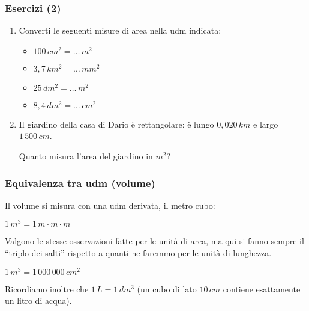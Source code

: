 \documentclass[]{beamer}
\begin{document}
\begin{frame}
\frametitle{Esercizi (2)}
\begin{enumerate}
  \item Converti le seguenti misure di area nella udm indicata:
  \begin{multicols}{2}
    \begin{itemize}
        \item $ 100 \, cm^2 = \ldots \, m^2 $
        \item $ 3,7 \, km^2 = \ldots \, mm^2 $
        \item $ 25 \, dm^2 = \ldots \, m^2 $
        \item $ 8,4 \, dm^2 = \ldots \, cm^2 $
    \end{itemize}
  \end{multicols}
  \item Il giardino della casa di Dario è rettangolare: è lungo $ 0,020 \, km $ e largo $ 1\,500 \, cm $.
  
  Quanto misura l'area del giardino in $ m^2 $?
\end{enumerate}
\end{frame}




\begin{frame}
\frametitle{Equivalenza tra udm (volume)}
Il volume si misura con una udm derivata, il \alert<1>{metro cubo}:
\begin{center}
$ 1 \, m^3 = 1 \, m \cdot m \cdot m $
\end{center}\pause
Valgono le stesse osservazioni fatte per le unità di area, ma qui \alert<2>{si fanno sempre il ``triplo dei salti''} rispetto a quanti ne faremmo per le unità di lunghezza.
\begin{center}
$ 1 \, m^3 = 1\,000\,000 \, cm^2 $
\end{center}\pause
Ricordiamo inoltre che \alert{$ 1 \, L = 1 \, dm^3 $} (un cubo di lato $ 10 \, cm $ contiene esattamente un litro di acqua).
\end{frame}
\end{document}
